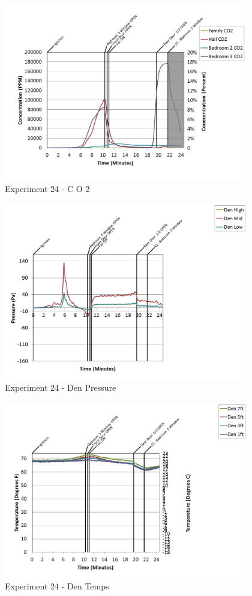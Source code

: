 \documentclass{article}
\begin{document}
\begin{appendices}
\clearpage

\begin{figure}[h!]
	\centering
	\includegraphics[height=3.05in]{0_Images/Results_Charts/Exp_24_Charts/CO2.png}
	\caption{Experiment 24 - C O 2}
\end{figure}


\begin{figure}[h!]
	\centering
	\includegraphics[height=3.05in]{0_Images/Results_Charts/Exp_24_Charts/DenPressure.png}
	\caption{Experiment 24 - Den Pressure}
\end{figure}

\clearpage

\begin{figure}[h!]
	\centering
	\includegraphics[height=3.05in]{0_Images/Results_Charts/Exp_24_Charts/DenTemps.png}
	\caption{Experiment 24 - Den Temps}
\end{figure}



\end{appendices}
\end{document}
